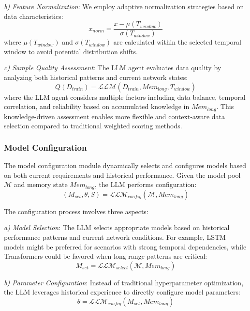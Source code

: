 \documentclass[conference]{IEEEtran}
\begin{document}
\textit{b) Feature Normalization}: We employ adaptive normalization strategies based on data characteristics:
\begin{equation}
    x_{norm} = \frac{x - \mu(T_{window})}{\sigma(T_{window})}
\end{equation}
where $\mu(T_{window})$ and $\sigma(T_{window})$ are calculated within the selected temporal window to avoid potential distribution shifts.

\textit{c) Sample Quality Assessment}: The LLM agent evaluates data quality by analyzing both historical patterns and current network states:
\begin{equation}
    Q(D_{train}) = \mathcal{LLM}(D_{train}, Mem_{long}, T_{window})
\end{equation}
where the LLM agent considers multiple factors including data balance, temporal correlation, and reliability based on accumulated knowledge in $Mem_{long}$. This knowledge-driven assessment enables more flexible and context-aware data selection compared to traditional weighted scoring methods.

\subsubsection{Model Configuration}
The model configuration module dynamically selects and configures models based on both current requirements and historical performance. Given the model pool $\mathcal{M}$ and memory state $Mem_{long}$, the LLM performs configuration:
\begin{equation}
    (M_{set}, \theta, S) = \mathcal{LLM}_{config}(\mathcal{M}, Mem_{long})
\end{equation}

The configuration process involves three aspects:

\textit{a) Model Selection}: The LLM selects appropriate models based on historical performance patterns and current network conditions. For example, LSTM models might be preferred for scenarios with strong temporal dependencies, while Transformers could be favored when long-range patterns are critical:
\begin{equation}
    M_{set} = \mathcal{LLM}_{select}(\mathcal{M}, Mem_{long})
\end{equation}

\textit{b) Parameter Configuration}: Instead of traditional hyperparameter optimization, the LLM leverages historical experience to directly configure model parameters:
\begin{equation}
    \theta = \mathcal{LLM}_{config}(M_{set}, Mem_{long})
\end{equation}
\end{document}
